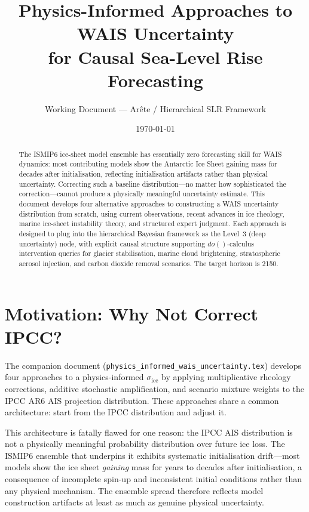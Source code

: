 \documentclass[11pt]{article}
\title{Physics-Informed Approaches to WAIS Uncertainty\\
  for Causal Sea-Level Rise Forecasting}
\author{Working Document --- Ar\^{e}te / Hierarchical SLR Framework}
\date{\today}
\newcommand{\sigice}{\sigma_{\text{ice}}}
\begin{document}
\maketitle

\begin{abstract}
The ISMIP6 ice-sheet model ensemble has essentially zero forecasting skill for WAIS dynamics: most contributing models show the Antarctic Ice Sheet gaining mass for decades after initialisation, reflecting initialisation artifacts rather than physical uncertainty.  Correcting such a baseline distribution---no matter how sophisticated the correction---cannot produce a physically meaningful uncertainty estimate.  This document develops four alternative approaches to constructing a WAIS uncertainty distribution from scratch, using current observations, recent advances in ice rheology, marine ice-sheet instability theory, and structured expert judgment.  Each approach is designed to plug into the hierarchical Bayesian framework as the Level~3 (deep uncertainty) node, with explicit causal structure supporting $do()$-calculus intervention queries for glacier stabilisation, marine cloud brightening, stratospheric aerosol injection, and carbon dioxide removal scenarios.  The target horizon is 2150.
\end{abstract}


\section{Motivation: Why Not Correct IPCC?}
\label{sec:motivation}

The companion document (\texttt{physics\_informed\_wais\_uncertainty.tex}) develops four approaches to a physics-informed $\sigice$ by applying multiplicative rheology corrections, additive stochastic amplification, and scenario mixture weights to the IPCC AR6 AIS projection distribution.  These approaches share a common architecture: start from the IPCC distribution and adjust it.

This architecture is fatally flawed for one reason: the IPCC AIS distribution is not a physically meaningful probability distribution over future ice loss.  The ISMIP6 ensemble \citep{seroussi2020ismip6, seroussi2024evolution} that underpins it exhibits systematic initialisation drift---most models show the ice sheet \emph{gaining} mass for years to decades after initialisation, a consequence of incomplete spin-up and inconsistent initial conditions rather than any physical mechanism.  The ensemble spread therefore reflects model construction artifacts at least as much as genuine physical uncertainty.
\end{document}
